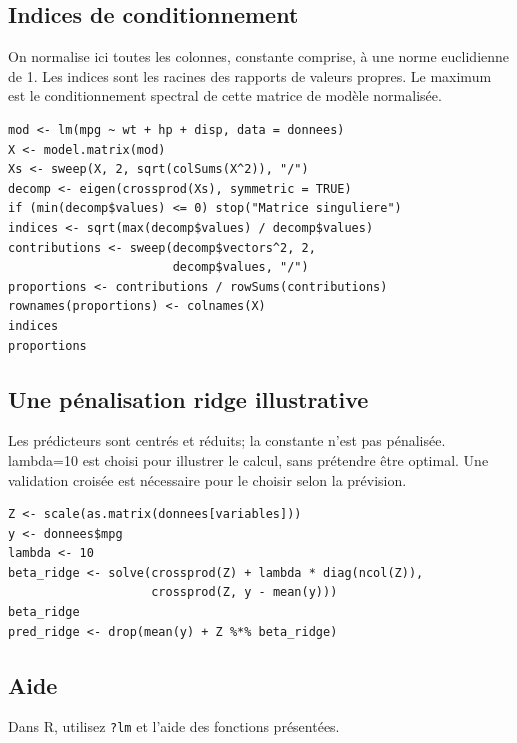 \documentclass[letterpaper,11pt]{article}
\begin{document}
\par\medskip\noindent\begin{minipage}{\linewidth}
\subsection*{Indices de conditionnement}
On normalise ici toutes les colonnes, constante comprise, à une norme euclidienne de 1. Les indices sont les racines des rapports de valeurs propres. Le maximum est le conditionnement spectral de cette matrice de modèle normalisée.
\begin{Verbatim}
mod <- lm(mpg ~ wt + hp + disp, data = donnees)
X <- model.matrix(mod)
Xs <- sweep(X, 2, sqrt(colSums(X^2)), "/")
decomp <- eigen(crossprod(Xs), symmetric = TRUE)
if (min(decomp$values) <= 0) stop("Matrice singuliere")
indices <- sqrt(max(decomp$values) / decomp$values)
contributions <- sweep(decomp$vectors^2, 2,
                       decomp$values, "/")
proportions <- contributions / rowSums(contributions)
rownames(proportions) <- colnames(X)
indices
proportions
\end{Verbatim}

\end{minipage}\par
\par\medskip\noindent\begin{minipage}{\linewidth}
\subsection*{Une pénalisation ridge illustrative}
Les prédicteurs sont centrés et réduits; la constante n'est pas pénalisée. lambda=10 est choisi pour illustrer le calcul, sans prétendre être optimal. Une validation croisée est nécessaire pour le choisir selon la prévision.
\begin{Verbatim}
Z <- scale(as.matrix(donnees[variables]))
y <- donnees$mpg
lambda <- 10
beta_ridge <- solve(crossprod(Z) + lambda * diag(ncol(Z)),
                    crossprod(Z, y - mean(y)))
beta_ridge
pred_ridge <- drop(mean(y) + Z %*% beta_ridge)
\end{Verbatim}

\end{minipage}\par
\par\medskip\noindent\begin{minipage}{\linewidth}
\subsection*{Aide}
Dans R, utilisez \texttt{?lm} et l’aide des fonctions présentées. 
\end{minipage}\par
\end{document}
